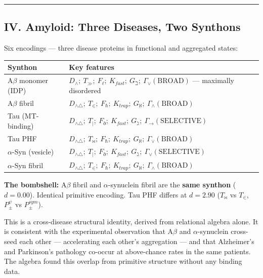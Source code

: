 \documentclass[10pt,a4paper]{article}
\begin{document}
\begin{center}
\rule{0.5\textwidth}{0.4pt}
\end{center}

\subsection{IV. Amyloid: Three Diseases, Two Synthons}

Six encodings --- three disease proteins in functional and aggregated states:

\begin{table}[htbp]
\centering
\small
{}
\begin{tabularx}{\textwidth}{>{\centering\arraybackslash}X >{\centering\arraybackslash}X}
\toprule
\rowcolor{gray!25}\textbf{Synthon} & \textbf{Key features} \\
\midrule
\rowcolors{1}{white}{gray!10}
A$\beta$ monomer (IDP) & $D_\wedge;\ T_\gg;\ F_\ell;\ K_{fast};\ G_\beth;\ \Gamma_\vee(\text{BROAD})$ --- maximally disordered \\
A$\beta$ fibril & $D_{\wedge\triangle};\ T_\in;\ F_\hbar;\ K_{trap};\ G_\aleph;\ \Gamma_\wedge(\text{BROAD})$ \\
Tau (MT-binding) & $D_{\wedge\triangle};\ T_{\vert};\ F_\eth;\ K_{fast};\ G_\gimel;\ \Gamma_\to(\text{SELECTIVE})$ \\
Tau PHF & $D_{\wedge\triangle};\ T_\bowtie;\ F_\hbar;\ K_{trap};\ G_\aleph;\ \Gamma_\vee(\text{BROAD})$ \\
$\alpha$-Syn (vesicle) & $D_{\wedge\triangle};\ T_{\vert};\ F_\eth;\ K_{fast};\ G_\gimel;\ \Gamma_\vee(\text{SELECTIVE})$ \\
$\alpha$-Syn fibril & $D_{\wedge\triangle};\ T_\in;\ F_\hbar;\ K_{trap};\ G_\aleph;\ \Gamma_\wedge(\text{BROAD})$ \\
\bottomrule
\end{tabularx}
\end{table}

\textbf{The bombshell:} A$\beta$ fibril and $\alpha$-synuclein fibril are the \textbf{same synthon} ($d = 0.00$). Identical primitive encoding. Tau PHF differs at $d = 2.90$ ($T_\bowtie$ vs $T_\in$, $P_\pm^\psi$ vs $P_\pm^{sym}$).

This is a cross-disease structural identity, derived from relational algebra alone. It is consistent with the experimental observation that A$\beta$ and $\alpha$-synuclein cross-seed each other --- accelerating each other's aggregation --- and that Alzheimer's and Parkinson's pathology co-occur at above-chance rates in the same patients. The algebra found this overlap from primitive structure without any binding data.
\end{document}
